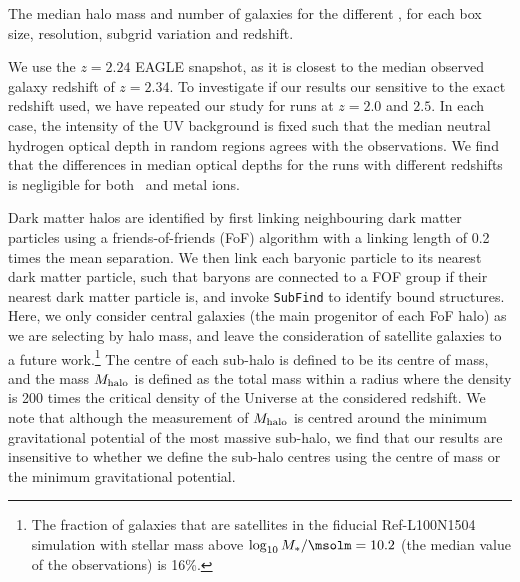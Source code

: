 \documentclass[useAMS,usenatbib,letterpaper]{mn2e}
\begin{document}
 \begin{table*}
 \caption{The median halo mass and number of galaxies for 
   the different \mhmin,
  for each box size, resolution, subgrid variation and redshift.}

\label{tab:galpropb}
\end{table*}


We use the $z=2.24$ EAGLE snapshot, as it is closest to the median observed 
galaxy redshift of  $z = 2.34$. To investigate if our results our sensitive to 
the exact redshift used, we have repeated our study for runs 
at $z=2.0$ and $2.5$. In each case, the intensity of the UV background 
is fixed such that the median neutral
hydrogen optical depth in random regions agrees with the observations. 
We find that the differences in median optical depths for the runs
with different redshifts is negligible for both \hone\ and metal ions. 

Dark matter halos are identified by first linking neighbouring dark matter particles using a
friends-of-friends (FoF) algorithm with a linking length of 0.2 times the mean separation.
We then link each baryonic particle to its nearest dark matter particle,
such that baryons are connected to a FOF group if their nearest dark matter 
particle is, and invoke \texttt{SubFind} \citep{springel01, dolag09} to identify bound structures.
Here, we only consider central galaxies (the main progenitor of each FoF halo)
as we are selecting by halo mass,
and leave the consideration of satellite galaxies to a future work.\footnote{
The fraction of galaxies that are satellites in the fiducial Ref-L100N1504 simulation
with stellar mass above $\log_{10} M_{\ast} / \msolm = 10.2$ (the median 
value of the observations) is 16\%.}
The centre of each sub-halo is defined to be its
centre of mass, and the mass $M_{\rm halo}$ is defined as the total 
mass within a radius where the density is 
200 times the critical density of the Universe at the considered redshift. 
We note that although the measurement of $M_{\rm halo}$ is centred around the 
minimum gravitational potential of the most massive sub-halo, we find that our results are insensitive
to whether we define the sub-halo centres using the centre of mass or the minimum gravitational potential. 
\end{document}
